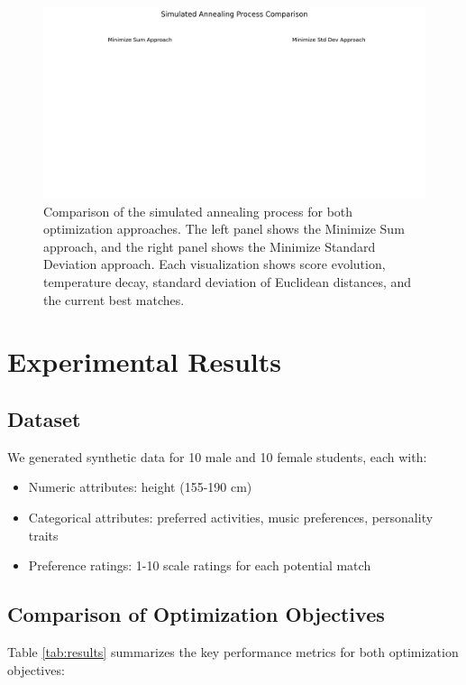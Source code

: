 \documentclass[10pt,journal,compsoc]{IEEEtran}
\begin{document}
\begin{figure}[!t]
\centering
\includegraphics[width=\columnwidth]{annealing_comparison.png}
\caption{Comparison of the simulated annealing process for both optimization approaches. The left panel shows the Minimize Sum approach, and the right panel shows the Minimize Standard Deviation approach. Each visualization shows score evolution, temperature decay, standard deviation of Euclidean distances, and the current best matches.}
\label{fig:annealing_comparison}
\end{figure}

\section{Experimental Results}

\subsection{Dataset}
We generated synthetic data for 10 male and 10 female students, each with:
\begin{itemize}
\item Numeric attributes: height (155-190 cm)
\item Categorical attributes: preferred activities, music preferences, personality traits
\item Preference ratings: 1-10 scale ratings for each potential match
\end{itemize}

\subsection{Comparison of Optimization Objectives}

Table \ref{tab:results} summarizes the key performance metrics for both optimization objectives:
\end{document}
